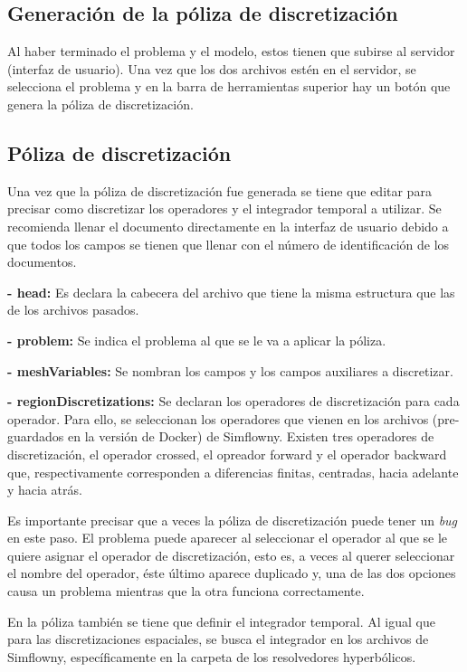\documentclass[11pt]{article}
\begin{document}
\subsection{Generación de la póliza de discretización}
Al haber terminado el problema y el modelo, estos tienen que subirse al servidor (interfaz de usuario). Una vez que los dos archivos estén en el servidor, se selecciona el problema y en la barra de herramientas superior hay un botón que genera la póliza de discretización.
 
\subsection{Póliza de discretización}
Una vez que la póliza de discretización fue generada se tiene que editar para precisar como discretizar los operadores y el integrador temporal a utilizar. Se recomienda llenar el documento directamente en la interfaz de usuario debido a que todos los campos se tienen que llenar con el número de identificación de los documentos.

{\bf - head:}
Es declara la cabecera del archivo que tiene la misma estructura que las de los archivos pasados.

{\bf - problem:}
Se indica el problema al que se le va a aplicar la póliza.

{\bf - meshVariables:}
Se nombran los campos y los campos auxiliares a discretizar.

{\bf - regionDiscretizations:}
Se declaran los operadores de discretización para cada operador. Para ello, se seleccionan los operadores que vienen en los archivos (pre-guardados en la versión de Docker) de Simflowny. Existen tres operadores de discretización, el operador crossed, el opreador forward y el operador backward que, respectivamente corresponden a diferencias finitas, centradas, hacia adelante y hacia atrás. 

Es importante precisar que a veces la póliza de discretización puede tener un {\itshape bug} en este paso. El problema puede aparecer al seleccionar el operador al que se le quiere asignar el operador de discretización, esto es, a veces al querer seleccionar el nombre del operador, éste último aparece duplicado y, una de las dos opciones causa un problema mientras que la otra funciona correctamente.

En la póliza también se tiene que definir el integrador temporal. Al igual que para las discretizaciones espaciales, se busca el integrador en los archivos de Simflowny, específicamente en la carpeta de los resolvedores hyperbólicos. 
\end{document}
